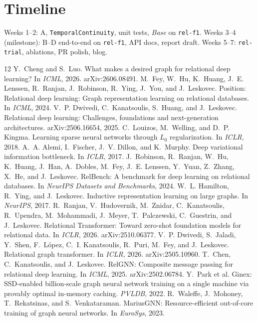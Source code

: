 \documentclass{article}
\newcommand{\code}[1]{\texttt{#1}}
\begin{document}
\section{Timeline}
\vspace{-0.5em}
Weeks 1--2: A, \code{TemporalContinuity}, unit tests, \emph{Base} on \code{rel-f1}. Weeks 3--4 (milestone): B--D end-to-end on \code{rel-f1}, API docs, report draft. Weeks 5--7: \code{rel-trial}, ablations, PR polish, blog.
\footnotesize
\begin{thebibliography}{12}
\setlength{\itemsep}{0pt}
 Y.~Cheng and S.~Luo. What makes a desired graph for relational deep learning? In \emph{ICML}, 2026. arXiv:2606.08491.
 M.~Fey, W.~Hu, K.~Huang, J.~E. Lenssen, R.~Ranjan, J.~Robinson, R.~Ying, J.~You, and J.~Leskovec. Position: Relational deep learning: Graph representation learning on relational databases. In \emph{ICML}, 2024.
 V.~P. Dwivedi, C.~Kanatsoulis, S.~Huang, and J.~Leskovec. Relational deep learning: Challenges, foundations and next-generation architectures. arXiv:2506.16654, 2025.
 C.~Louizos, M.~Welling, and D.~P. Kingma. Learning sparse neural networks through $L_0$ regularization. In \emph{ICLR}, 2018.
 A.~A. Alemi, I.~Fischer, J.~V. Dillon, and K.~Murphy. Deep variational information bottleneck. In \emph{ICLR}, 2017.
 J.~Robinson, R.~Ranjan, W.~Hu, K.~Huang, J.~Han, A.~Dobles, M.~Fey, J.~E. Lenssen, Y.~Yuan, Z.~Zhang, X.~He, and J.~Leskovec. RelBench: A benchmark for deep learning on relational databases. In \emph{NeurIPS Datasets and Benchmarks}, 2024.
 W.~L. Hamilton, R.~Ying, and J.~Leskovec. Inductive representation learning on large graphs. In \emph{NeurIPS}, 2017.
 R.~Ranjan, V.~Hudovernik, M.~Znidar, C.~Kanatsoulis, R.~Upendra, M.~Mohammadi, J.~Meyer, T.~Palczewski, C.~Guestrin, and J.~Leskovec. Relational Transformer: Toward zero-shot foundation models for relational data. In \emph{ICLR}, 2026. arXiv:2510.06377.
 V.~P. Dwivedi, S.~Jaladi, Y.~Shen, F.~L\'opez, C.~I. Kanatsoulis, R.~Puri, M.~Fey, and J.~Leskovec. Relational graph transformer. In \emph{ICLR}, 2026. arXiv:2505.10960.
 T.~Chen, C.~Kanatsoulis, and J.~Leskovec. RelGNN: Composite message passing for relational deep learning. In \emph{ICML}, 2025. arXiv:2502.06784.
 Y.~Park et al. Ginex: SSD-enabled billion-scale graph neural network training on a single machine via provably optimal in-memory caching. \emph{PVLDB}, 2022.
 R.~Waleffe, J.~Mohoney, T.~Rekatsinas, and S.~Venkataraman. MariusGNN: Resource-efficient out-of-core training of graph neural networks. In \emph{EuroSys}, 2023.
\end{thebibliography}
\end{document}
